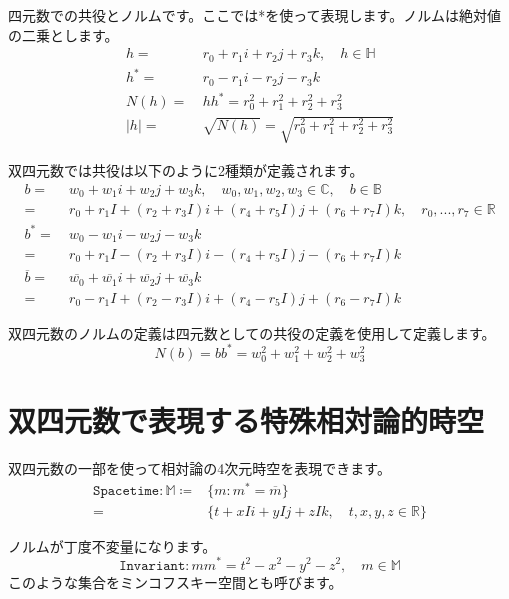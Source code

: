 \documentclass[a4paper,12pt,notitlepage]{jsreport}
\begin{document}
四元数での共役とノルムです。ここでは*を使って表現します。ノルムは絶対値の二乗とします。
\begin{equation}
  \begin{split}
    h=~&r_0+r_1i+r_2j+r_3k,\quad h\in\mathbb{H}\\
    h^*=~&r_0-r_1i-r_2j-r_3k\\
    N(h)=~&hh^*=r_0^2+r_1^2+r_2^2+r_3^2\\
    |h|=~&\sqrt{N(h)}=\sqrt{r_0^2+r_1^2+r_2^2+r_3^2}
  \end{split}
\end{equation}

双四元数では共役は以下のように2種類が定義されます。
\begin{equation}
  \begin{split}
    b=~&w_0+w_1i+w_2j+w_3k,\quad w_0,w_1,w_2,w_3\in\mathbb{C},\quad b\in\mathbb{B}\\
    =~&r_0+r_1I+(r_2+r_3I)i+(r_4+r_5I)j+(r_6+r_7I)k,\quad r_0,...,r_7\in\mathbb{R}\\
    b^*=~&w_0-w_1i-w_2j-w_3k\\
    =~&r_0+r_1I-(r_2+r_3I)i-(r_4+r_5I)j-(r_6+r_7I)k\\
    \overline{b}=~&\overline{w_0}+\overline{w_1}i+\overline{w_2}j+\overline{w_3}k\\
    =~&r_0-r_1I+(r_2-r_3I)i+(r_4-r_5I)j+(r_6-r_7I)k
  \end{split}
\end{equation}

双四元数のノルムの定義は四元数としての共役の定義を使用して定義します。
\begin{equation}
  N(b)=bb^*=w_0^2+w_1^2+w_2^2+w_3^2
\end{equation}

\section{双四元数で表現する特殊相対論的時空}

双四元数の一部を使って相対論の4次元時空を表現できます。
\begin{equation}
  \begin{split}
    \texttt{Spacetime}:\mathbb{M}\coloneq &\{m:m^*=\overline{m}\}\\
    =&\{t+xIi+yIj+zIk,\quad t,x,y,z\in\mathbb{R}\}
  \end{split}
\end{equation}

ノルムが丁度不変量になります。
\begin{equation}
  \texttt{Invariant}:mm^*=t^2-x^2-y^2-z^2,\quad m\in\mathbb{M}
\end{equation}
このような集合をミンコフスキー空間とも呼びます。
\end{document}
